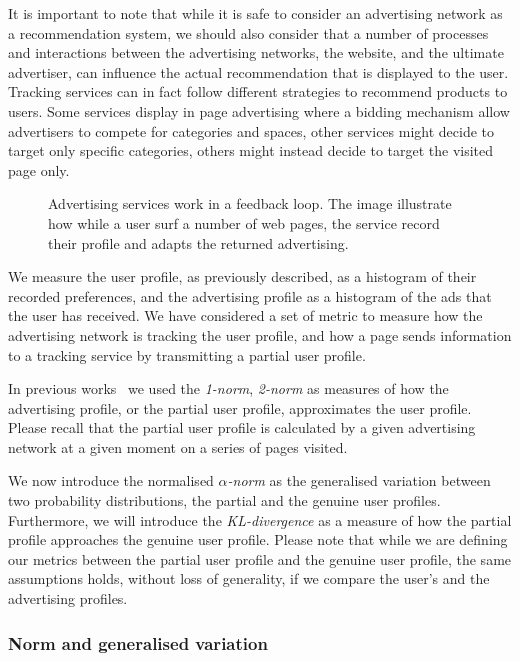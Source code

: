 It is important to note that while it is safe to consider an advertising network as a recommendation system, we should also consider that a number of processes and interactions between the advertising networks, the website, and the ultimate advertiser, can influence the actual recommendation that is displayed to the user. Tracking services can in fact follow different strategies to recommend products to users. Some services display in page advertising where a bidding mechanism allow advertisers to compete for categories and spaces, other services might decide to target only specific categories, others might instead decide to target the visited page only.

\begin{figure}
\centerline{\epsfxsize=350pt}
\caption[Advertising services feedback loop]{Advertising services work in a feedback loop. The image illustrate how while a user surf a number of web pages, the service record their profile and adapts the returned advertising.}
\label{fig:advertising-loop}
\end{figure}

We measure the user profile, as previously described, as a histogram of their recorded preferences, and the advertising profile as a histogram of the ads that the user has received. We have considered a set of metric to measure how the advertising network is tracking the user profile, and how a page sends information to a tracking service by transmitting a partial user profile. 

In previous works\cite{puglisi2016web}~\cite{puglisi2015you} we used the \emph{1-norm}, \emph{2-norm} as measures of how the advertising profile, or the partial user profile, approximates the user profile. Please recall that the partial user profile is calculated by a given advertising network at a given moment on a series of pages visited.

We now introduce the normalised \emph{$\alpha$-norm} as the generalised variation  between two probability distributions, the partial and the genuine user profiles. Furthermore, we will introduce the \emph{KL-divergence} as a measure of how the partial profile approaches the genuine user profile. Please note that while we are defining our metrics between the partial user profile and the genuine user profile, the same assumptions holds, without loss of generality, if we compare the user's and the advertising profiles.

\subsubsection{Norm and generalised variation}

